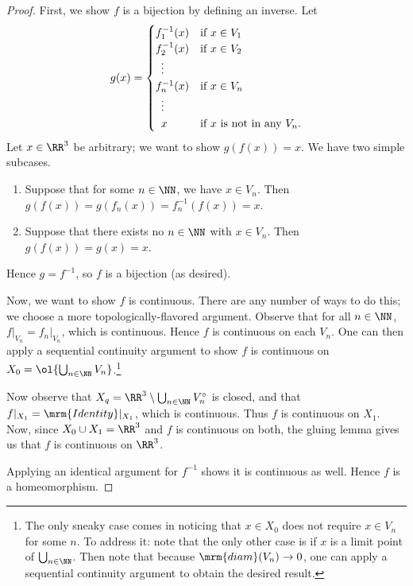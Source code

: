 \begin{proof}
  First, we show $f$ is a bijection by defining an inverse. Let
  \[
    g(x) =
    \begin{cases}
      f_1^{-1}(x) & \text{if } x \in V_1 \\
      f_2^{-1}(x) & \text{if } x \in V_2 \\
      \hspace{.5em} \vdots & \\
      f_n^{-1}(x) & \text{if } x \in V_n \\
      \hspace{.5em} \vdots & \\
      \hspace{.5em} x & \text{if $x$ is not in any $V_n$}.
    \end{cases}
  \]
  Let $x \in \RR^3$ be arbitrary; we want to show $g(f(x)) = x$. We
  have two simple subcases.
  \begin{enumerate}[label=\arabic*)]
    \item Suppose that for some $n \in \NN$, we have $x \in V_n$. Then
      $g(f(x)) = g(f_n(x)) = f^{-1}_n(f(x)) = x$.
    \item Suppose that there exists no $n \in\NN$ with $x \in V_n$.
      Then $g(f(x)) = g(x) = x$.
  \end{enumerate}
  Hence $g = f^{-1}$, so $f$ is a bijection (as desired).

  Now, we want to show $f$ is continuous. There are any number of ways
  to do this; we choose a more topologically-flavored argument.
  Observe that for all $n \in\NN$, $f\vert_{V_n} = f_n\vert_{V_n}$,
  which is continuous. Hence $f$ is continuous on each $V_n$. One can
  then apply a sequential continuity argument to show $f$ is
  continuous on $X_0 = \ol{\bigcup_{n\in\NN} V_n}$.\footnote{The only
    sneaky case comes in noticing that $x \in X_0$ does not require $x
    \in V_n$ for some $n$. To address it: note that the only other
    case is if $x$ is a limit point of $\bigcup_{n\in\NN}$. Then note
    that because $\mrm{diam}(V_n) \to 0$, one can apply a sequential
    continuity argument to obtain the desired result.
  }

  Now observe that $X_q = \RR^3 \setminus \bigcup_{n\in\NN}V_n^\circ$
  is closed, and that $f\vert_{X_1} = \mrm{Identity}\vert_{X_1}$,
  which is continuous. Thus $f$ is continuous on $X_1$. Now, since
  $X_0 \cup X_1 = \RR^3$ and $f$ is continuous on both, the gluing
  lemma gives us that $f$ is continuous on $\RR^3$.

  Applying an identical argument for $f^{-1}$ shows it is continuous
  as well. Hence $f$ is a homeomorphism.
\end{proof}
